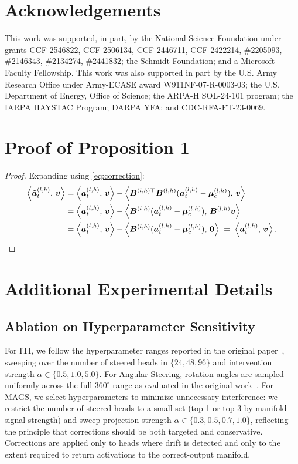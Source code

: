 \documentclass{article}
\newcommand{\ba}{\bm{a}}
\newcommand{\bmu}{\bm{\mu}}
\newcommand{\bB}{\bm{B}}
\newcommand{\inner}[2]{\left\langle #1,\, #2 \right\rangle}
\begin{document}
\section*{Acknowledgements}
This work was supported, in part, by the National Science Foundation under grants CCF-2546822, CCF-2506134, CCF-2446711, CCF-2422214, \#2205093, \#2146343, \#2134274, \#2441832; the Schmidt Foundation; and a Microsoft Faculty Fellowship. This work was also supported in part by the U.S. Army Research Office under Army-ECASE award W911NF-07-R-0003-03; the U.S. Department of Energy, Office of Science; the ARPA-H SOL-24-101 program; the IARPA HAYSTAC Program; DARPA YFA; and CDC-RFA-FT-23-0069.


\newpage

\appendix

\section{Proof of Proposition 1}
\begin{proof}
    Expanding using \eqref{eq:correction}:
    \begin{align}
        \inner{\tilde{\ba}_t^{(l,h)}}{\bm{v}}
        &= \inner{\ba_t^{(l,h)}}{\bm{v}}
        - \inner{\bB^{(l,h)\top}\bB^{(l,h)}
            (\ba_t^{(l,h)} - \bmu_c^{(l,h)})}{\bm{v}} \\
        &= \inner{\ba_t^{(l,h)}}{\bm{v}}
        - \inner{\bB^{(l,h)}(\ba_t^{(l,h)} - \bmu_c^{(l,h)})}
                {\bB^{(l,h)}\bm{v}} \\
        &= \inner{\ba_t^{(l,h)}}{\bm{v}}
        - \inner{\bB^{(l,h)}(\ba_t^{(l,h)} - \bmu_c^{(l,h)})}{\bm{0}}
        \;=\; \inner{\ba_t^{(l,h)}}{\bm{v}}. \qedhere
    \end{align}
\end{proof}

\section{Additional Experimental Details}
\label{app:ablation}
\subsection{Ablation on Hyperparameter Sensitivity}
For ITI, we follow the hyperparameter ranges reported in the original paper~\cite{li2023iti}, sweeping over the number of steered heads in $\{24, 48, 96\}$ and intervention strength $\alpha \in \{0.5, 1.0, 5.0\}$. For Angular Steering, rotation angles are sampled uniformly across the full $360^{\circ}$ range as evaluated in the original work~\cite{vu2025angular}. For MAGS, we select hyperparameters to minimize unnecessary interference: we restrict the number of steered heads to a small set (top-1 or top-3 by manifold signal strength) and sweep projection strength $\alpha \in \{0.3, 0.5, 0.7, 1.0\}$, reflecting the principle that corrections should be both targeted and conservative. Corrections are applied only to heads where drift is detected and only to the extent required to return activations to the correct-output manifold.
\end{document}
